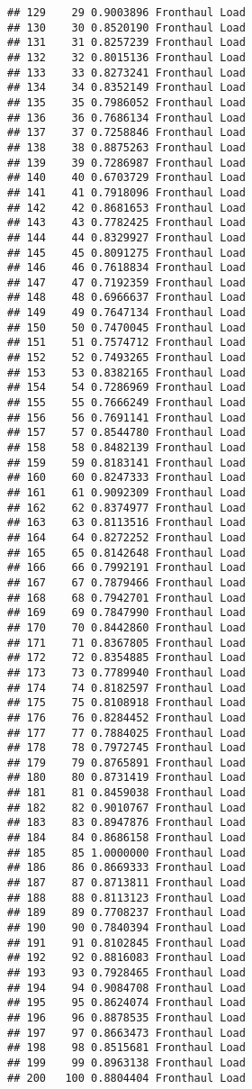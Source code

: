 \documentclass[
]{article}
\newenvironment{Shaded}{\begin{snugshade}}{\end{snugshade}}
\newcommand{\CommentTok}[1]{\textcolor[rgb]{0.56,0.35,0.01}{\textit{#1}}}
\begin{document}
\begin{verbatim}
## 129    29 0.9003896 Fronthaul Load
## 130    30 0.8520190 Fronthaul Load
## 131    31 0.8257239 Fronthaul Load
## 132    32 0.8015136 Fronthaul Load
## 133    33 0.8273241 Fronthaul Load
## 134    34 0.8352149 Fronthaul Load
## 135    35 0.7986052 Fronthaul Load
## 136    36 0.7686134 Fronthaul Load
## 137    37 0.7258846 Fronthaul Load
## 138    38 0.8875263 Fronthaul Load
## 139    39 0.7286987 Fronthaul Load
## 140    40 0.6703729 Fronthaul Load
## 141    41 0.7918096 Fronthaul Load
## 142    42 0.8681653 Fronthaul Load
## 143    43 0.7782425 Fronthaul Load
## 144    44 0.8329927 Fronthaul Load
## 145    45 0.8091275 Fronthaul Load
## 146    46 0.7618834 Fronthaul Load
## 147    47 0.7192359 Fronthaul Load
## 148    48 0.6966637 Fronthaul Load
## 149    49 0.7647134 Fronthaul Load
## 150    50 0.7470045 Fronthaul Load
## 151    51 0.7574712 Fronthaul Load
## 152    52 0.7493265 Fronthaul Load
## 153    53 0.8382165 Fronthaul Load
## 154    54 0.7286969 Fronthaul Load
## 155    55 0.7666249 Fronthaul Load
## 156    56 0.7691141 Fronthaul Load
## 157    57 0.8544780 Fronthaul Load
## 158    58 0.8482139 Fronthaul Load
## 159    59 0.8183141 Fronthaul Load
## 160    60 0.8247333 Fronthaul Load
## 161    61 0.9092309 Fronthaul Load
## 162    62 0.8374977 Fronthaul Load
## 163    63 0.8113516 Fronthaul Load
## 164    64 0.8272252 Fronthaul Load
## 165    65 0.8142648 Fronthaul Load
## 166    66 0.7992191 Fronthaul Load
## 167    67 0.7879466 Fronthaul Load
## 168    68 0.7942701 Fronthaul Load
## 169    69 0.7847990 Fronthaul Load
## 170    70 0.8442860 Fronthaul Load
## 171    71 0.8367805 Fronthaul Load
## 172    72 0.8354885 Fronthaul Load
## 173    73 0.7789940 Fronthaul Load
## 174    74 0.8182597 Fronthaul Load
## 175    75 0.8108918 Fronthaul Load
## 176    76 0.8284452 Fronthaul Load
## 177    77 0.7884025 Fronthaul Load
## 178    78 0.7972745 Fronthaul Load
## 179    79 0.8765891 Fronthaul Load
## 180    80 0.8731419 Fronthaul Load
## 181    81 0.8459038 Fronthaul Load
## 182    82 0.9010767 Fronthaul Load
## 183    83 0.8947876 Fronthaul Load
## 184    84 0.8686158 Fronthaul Load
## 185    85 1.0000000 Fronthaul Load
## 186    86 0.8669333 Fronthaul Load
## 187    87 0.8713811 Fronthaul Load
## 188    88 0.8113123 Fronthaul Load
## 189    89 0.7708237 Fronthaul Load
## 190    90 0.7840394 Fronthaul Load
## 191    91 0.8102845 Fronthaul Load
## 192    92 0.8816083 Fronthaul Load
## 193    93 0.7928465 Fronthaul Load
## 194    94 0.9084708 Fronthaul Load
## 195    95 0.8624074 Fronthaul Load
## 196    96 0.8878535 Fronthaul Load
## 197    97 0.8663473 Fronthaul Load
## 198    98 0.8515681 Fronthaul Load
## 199    99 0.8963138 Fronthaul Load
## 200   100 0.8804404 Fronthaul Load
\end{verbatim}

\begin{Shaded}
\end{Shaded}
\end{document}
